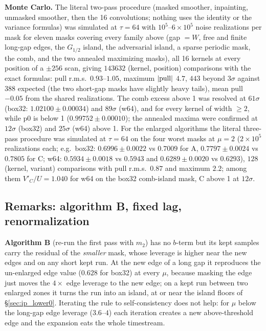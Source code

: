 \documentclass{article}
\numberwithin{equation}{section}   %
\begin{document}
{\bf Monte Carlo.}  The literal two-pass procedure (masked smoother, inpainting, unmasked smoother,
then the 16 convolutions; nothing uses the identity or the variance formulas) was simulated at
$\tau = 64$ with $10^5$--$6 \times 10^5$ noise realizations per mask for eleven masks covering every
family above (gap $= W$, free and finite long-gap edges, the $G_{1/2}$ island, the adversarial island, a
sparse periodic mask, the comb, and the two annealed maximizing masks), all 16 kernels at every position
of a $\pm 256$ scan, giving $143632$ (kernel, position) comparisons with the exact formulas: pull r.m.s.\
$0.93$--$1.05$, maximum $|{\rm pull}|$ $4.7$, $443$ beyond $3\sigma$ against $388$ expected (the two
short-gap masks have slightly heavy tails), mean pull $-0.05$ from the shared realizations.  The comb
excess above 1 was resolved at $61\sigma$ (box32: $1.02100 \pm 0.00034$) and $89\sigma$ (w64), and for
every kernel of width $\ge 2$, while p0 is below 1 ($0.99752 \pm 0.00010$); the annealed maxima were
confirmed at $12\sigma$ (box32) and $25\sigma$ (w64) above 1.  For the enlarged algorithms the literal
three-pass procedure was simulated at $\tau = 64$ on the four worst masks at $\mu = 2$ ($2 \times 10^5$
realizations each; e.g.\ box32: $0.6996 \pm 0.0022$ vs $0.7009$ for A, $0.7797 \pm 0.0024$ vs $0.7805$
for C; w64: $0.5934 \pm 0.0018$ vs $0.5943$ and $0.6289 \pm 0.0020$ vs $0.6293$), $128$ (kernel, variant)
comparisons with pull r.m.s.\ $0.87$ and maximum $2.2$; among them $V'_C/U = 1.040$ for w64 on the
box32 comb-island mask, C above 1 at $12\sigma$.

\subsection{Remarks: algorithm B, fixed lag, renormalization}
\label{sec:ip_remarks}

{\bf Algorithm B} (re-run the first pass with $m_2$) has no $b$-term but its kept samples carry the
residual of the {\em smaller} mask, whose leverage is higher near the new edges and on any short kept run.
At the new edge of a long gap it reproduces the un-enlarged edge value ($0.628$ for box32) at every $\mu$,
because masking the edge just moves the $4\times$ edge leverage to the new edge; on a kept run between
two enlarged zones it turns the run into an island, at or near the island floors of
\S\ref{sec:ip_lower0}.  Iterating the rule to self-consistency does not help: for $\mu$ below the
long-gap edge leverage ($3.6$--$4$) each iteration creates a new above-threshold edge and the expansion
eats the whole timestream.
\end{document}
